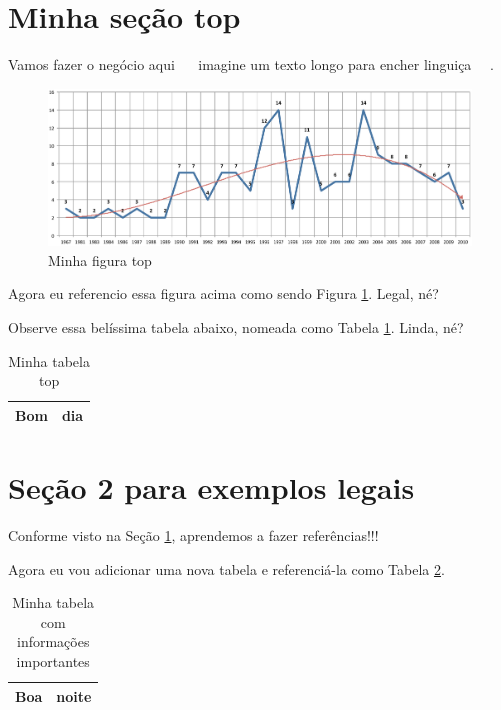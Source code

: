 \documentclass{article}
\begin{document}
\section{Minha seção top} \label{sec:top}
  Vamos fazer o negócio aqui ~~ imagine um texto longo para encher linguiça ~~.

  \begin{figure}[h]
    \includegraphics[scale=0.5]{abntex2-modelo-img-grafico}
    \caption{Minha figura top}
    \label{fig:top}
  \end{figure}

  Agora eu referencio essa figura acima como sendo Figura \ref{fig:top}. Legal, né?

  Observe essa belíssima tabela abaixo, nomeada como Tabela \ref{tab:top}. Linda, né?
  \begin{table}[h]
    \centering
    \begin{tabular}{| l | l |}
      \hline
      Bom & dia \\
      \hline
    \end{tabular}
    \label{tab:top}
    \caption{Minha tabela top}
  \end{table}

  \section{Seção 2 para exemplos legais}

  Conforme visto na Seção \ref{sec:top}, aprendemos a fazer referências!!!

  Agora eu vou adicionar uma nova tabela e referenciá-la como Tabela \ref{tab:informacao-importante}.

  \begin{table}[h]
	\centering
	\begin{tabular}{| l | l |}
		\hline
		Boa & noite \\
		\hline
	\end{tabular}
	\label{tab:informacao-importante}
	\caption{Minha tabela com informações importantes}
\end{table}
\end{document}

